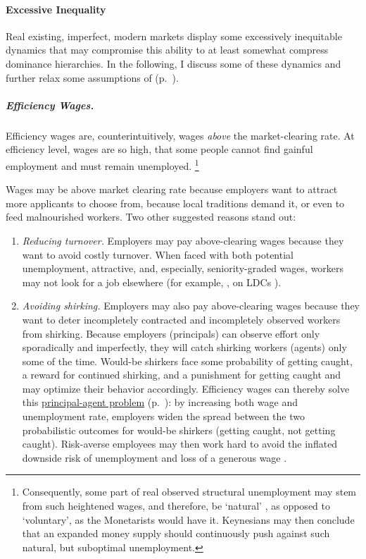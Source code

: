 \paragraph{Excessive Inequality}
	\label{sec:inequality-dynamics}
Real existing, imperfect, modern markets display some excessively inequitable dynamics that may compromise this ability to at least somewhat compress dominance hierarchies.
In the following, I discuss some of these dynamics and further relax some assumptions of   (p.~\pageref{sec:perfect-competition}).

\subparagraph[Efficiency Wages]{Efficiency Wages.}
	\label{sec:efficiency-wages}
Efficiency wages are, counterintuitively, wages \emph{above} the market-clearing rate.
At efficiency level, wages are so high, that some people cannot find gainful employment and must remain unemployed.
\footnote{
	Consequently, some part of real observed structural unemployment may stem from such heightened wages, and therefore, be `natural' \citep{Schlicht1978}, as opposed to `voluntary', as the Monetarists would have it.
	Keynesians may then conclude that an expanded money supply should continuously push against such natural, but suboptimal unemployment.
}

Wages may be above market clearing rate because employers want to attract more applicants to choose from, because local traditions demand it, or even to feed malnourished workers.
Two other suggested reasons stand out:

\begin{enumerate}
	\item \emph{Reducing turnover.}
	Employers may pay above-clearing wages because they want to avoid costly turnover.
	When faced with both potential unemployment, attractive, and, especially, seniority-graded wages, workers may not look for a job elsewhere (for example, \citealt{Salop1979}, on \glspl{LDC} \citealt{Stiglitz1974a}).

	\item \emph{Avoiding shirking.}
	Employers may also pay above-clearing wages because they want to deter incompletely contracted and incompletely observed workers from shirking.
	Because employers (principals) can observe effort only sporadically and imperfectly, they will catch shirking workers (agents) only some of the time.
	Would-be shirkers face some probability of getting caught, a reward for continued shirking, and a punishment for getting caught and may optimize their behavior accordingly.
	Efficiency wages can thereby solve this \hyperref[sec:principal-agent-problem]{principal-agent problem} (p.~\pageref{sec:principal-agent-problem}):
	by increasing both wage and unemployment rate, employers widen the spread between the two probabilistic outcomes for would-be shirkers (getting caught, not getting caught).
	Risk-averse employees may then work hard to avoid the inflated downside risk of unemployment and loss of a generous wage \citep{Stiglitz1984}.
\end{enumerate}

